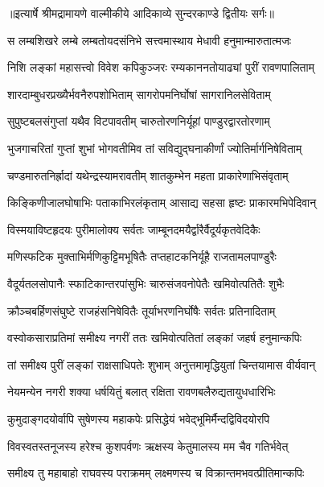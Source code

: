 {॥इत्यार्षे श्रीमद्रामायणे वाल्मीकीये आदिकाव्ये सुन्दरकाण्डे द्वितीयः सर्गः॥}


\twolineshloka
{स लम्बशिखरे लम्बे लम्बतोयदसंनिभे}
{सत्त्वमास्थाय मेधावी हनुमान्मारुतात्मजः} %

\twolineshloka
{निशि लङ्कां महासत्त्वो विवेश कपिकुञ्जरः}
{रम्यकाननतोयाढ्यां पुरीं रावणपालिताम्} %

\twolineshloka
{शारदाम्बुधरप्रख्यैर्भवनैरुपशोभिताम्}
{सागरोपमनिर्घोषां सागरानिलसेविताम्} %

\twolineshloka
{सुपुष्टबलसंगुप्तां यथैव विटपावतीम्}
{चारुतोरणनिर्यूहां पाण्डुरद्वारतोरणाम्} %

\twolineshloka
{भुजगाचरितां गुप्तां शुभां भोगवतीमिव}
{तां सविद्युद्घनाकीर्णां ज्योतिर्मार्गनिषेविताम्} %

\twolineshloka
{चण्डमारुतनिर्ह्रादां यथेन्द्रस्यामरावतीम्}
{शातकुम्भेन महता प्राकारेणाभिसंवृताम्} %

\twolineshloka
{किङ्किणीजालघोषाभिः पताकाभिरलंकृताम्}
{आसाद्य सहसा हृष्टः प्राकारमभिपेदिवान्} %

\twolineshloka
{विस्मयाविष्टहृदयः पुरीमालोक्य सर्वतः}
{जाम्बूनदमयैर्द्वारैर्वैदूर्यकृतवेदिकैः} %

\twolineshloka
{मणिस्फटिक मुक्ताभिर्मणिकुट्टिमभूषितैः}
{तप्तहाटकनिर्यूहै राजतामलपाण्डुरैः} %

\twolineshloka
{वैदूर्यतलसोपानैः स्फाटिकान्तरपांसुभिः}
{चारुसंजवनोपेतैः खमिवोत्पतितैः शुभैः} %

\twolineshloka
{क्रौञ्चबर्हिणसंघुष्टे राजहंसनिषेवितैः}
{तूर्याभरणनिर्घोषैः सर्वतः प्रतिनादिताम्} %

\twolineshloka
{वस्वोकसाराप्रतिमां समीक्ष्य नगरीं ततः}
{खमिवोत्पतितां लङ्कां जहर्ष हनुमान्कपिः} %

\twolineshloka
{तां समीक्ष्य पुरीं लङ्कां राक्षसाधिपतेः शुभाम्}
{अनुत्तमामृद्धियुतां चिन्तयामास वीर्यवान्} %

\twolineshloka
{नेयमन्येन नगरी शक्या धर्षयितुं बलात्}
{रक्षिता रावणबलैरुद्यतायुधधारिभिः} %

\twolineshloka
{कुमुदाङ्गदयोर्वापि सुषेणस्य महाकपेः}
{प्रसिद्धेयं भवेद्भूमिर्मैन्दद्विविदयोरपि} %

\twolineshloka
{विवस्वतस्तनूजस्य हरेश्च कुशपर्वणः}
{ऋक्षस्य केतुमालस्य मम चैव गतिर्भवेत्} %

\twolineshloka
{समीक्ष्य तु महाबाहो राघवस्य पराक्रमम्}
{लक्ष्मणस्य च विक्रान्तमभवत्प्रीतिमान्कपिः} %

